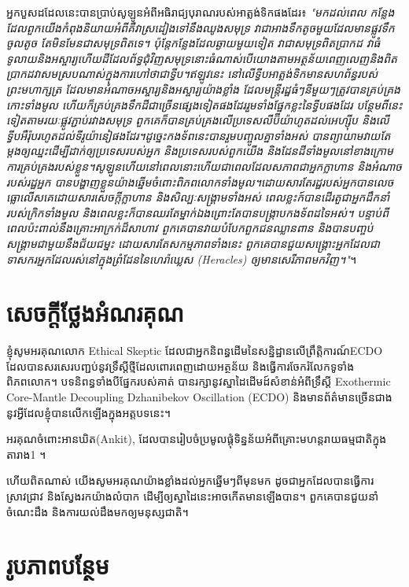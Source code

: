\documentclass[10pt,twocolumn,letterpaper]{article}
\begin{document}
អ្នកបួសដដែលនេះបានប្រាប់សូឡូនអំពីអធិរាជ្យបុរាណរបស់អាត្លង់ទិកផងដែរ៖ \textit{"មកដល់ពេល កន្លែងដែលពួកយើងកំពុងនិយាយអំពីគឺវាស្រដៀងទៅនឹងឈូងសមុទ្រ វាជាអាងទឹកតូចមួយដែលមានផ្លូវទឹកចូលតូច តែមិនមែនជាសមុទ្រពិតទេ។ ប៉ុន្តែកន្លែងដែលឆ្ងាយមួយទៀត វាជាសមុទ្រពិតប្រាកដ វាធំទូលាយនិងអស្ចារ្យហើយដីដែលព័ទ្ធជុំវិញសមុទ្រនោះធំណាស់​បើយោងតាមអត្ថន័យពេញលេញនិងពិតប្រាកដ​វាសមស្របណាស់ក្នុងការហៅថាជាទ្វីប។ឥឡូវនេះ នៅលើទ្វីបអាត្លង់ទិកមានសហព័ន្ធរបស់ព្រះមហាក្សត្រ ដែលមានអំណាចអស្ចារ្យនិងអស្ចារ្យយ៉ាងខ្លាំង ដែលមន្ត្រីរដ្ឋធំៗនីមួយៗត្រូវបានគ្រប់គ្រងកោះទាំងមូល ហើយក៏គ្រប់គ្រងទឹកដីជាច្រើនផ្សេងទៀតផងដែររួមទាំងផ្នែកខ្លះនៃទ្វីបផងដែរ បន្ថែមពីនេះទៀតតាមរយៈផ្លូវភ្ជាប់រវាងសមុទ្រ ពួកគេក៏បានគ្រប់គ្រងលើប្រទេសលីប៊ីយ៉ាហូតដល់អេហ្ស៊ីប និងលើទ្វីបអឺរ៉ុបរហូតដល់ទីរូយ៉ានៀផងដែរ។​ដូច្នេះកងទ័ពនេះបានរួមបញ្ចូលគ្នាទាំងអស់ បានព្យាយាមវាយតែម្តងឲ្យឈ្នះ​ដើម្បីដាក់ឲ្យប្រទេសរបស់អ្នក និងប្រទេសរបស់ពួកយើង និងដែនដីទាំងមូលនៅខាងក្រោមការគ្រប់គ្រងរបស់ខ្លួន។​សូឡូនហើយនៅពេលនោះហើយ​ជាពេលដែលសភាពជាអ្នកក្លាហាន និងអំណាចរបស់រដ្ឋអ្នក បានបង្ហាញខ្លួនយ៉ាងឆ្នើមចំពោះពិភពលោកទាំងមូល។​ដោយសារតែរដ្ឋរបស់អ្នកបានលេចធ្លោលើសគេដោយសារសេចក្តីក្លាហាន និងសិល្បៈសង្គ្រាមទាំងអស់ ពេលខ្លះក៍បានដើរតួជាអ្នកដឹកនាំរបស់ក្រិកទាំងមូល និងពេលខ្លះក៏បានឈរតែម្នាក់ឯង​ព្រោះតែបានបង្ក្រាបកងទ័ពដទៃអស់។ បន្ទាប់ពីពេលប៉ះពាល់នឹងគ្រោះអាក្រក់ដ៏សាហាវ ពួកគេបានវាយបំបែកពួកជនឈ្លានពាន និងបានបញ្ចប់សង្គ្រាមជាមួយនឹងជ័យជម្នះ ដោយសារតែសកម្មភាពទាំងនេះ ពួកគេបានជួយសង្គ្រោះអ្នកដែលជាទាសករ​អ្នកដែលរស់នៅក្នុងព្រំដែននៃហេរ៉ាឃ្លេស (Heracles) ឲ្យមានសេរីភាពមកវិញ។"}។

\section{សេចក្តីថ្លែងអំណរគុណ}

ខ្ញុំសូមអរគុណលោក Ethical Skeptic ដែលជាអ្នកនិពន្ធដើមនៃសន្និដ្ឋានលើព្រឹត្តិការណ៍ECDO ដែលបានសរសេរបញ្ជប់នូវទ្រឹស្តីថ្មីដែលពោរពេញដោយអត្ថន័យ និងធ្វើការចែករំលែកទូទាំងពិភពលោក។ បទនិពន្ធទាំងបីផ្នែករបស់គាត់ \cite{1} បានរក្សានូវស្នាដៃដើមដ៍សំខាន់អំពីទ្រឹស្តី Exothermic Core-Mantle Decoupling Dzhanibekov Oscillation (ECDO) និងមានព័ត៌មានច្រើនជាងនូវអ្វីដែលខ្ញុំបានលើកឡើងក្នុងអត្តបទនេះ។

អរគុណចំពោះអានឃិត(Ankit), ដែលបានរៀបចំប្រមូលផ្ដុំទិន្នន័យអំពីគ្រោះមហន្តរាយធម្មជាតិក្នុងតារាង1 ។

ហើយពិតណាស់ យើងសូមអរគុណយ៉ាងខ្លាំងដល់អ្នកឆ្នើមៗពីមុនមក ដូចជាអ្នកដែលបានធ្វើការស្រាវជ្រាវ និងស្វែងរកយ៉ាងលំបាក ដើម្បីឲ្យស្នាដៃនេះអាចកើតមានឡើងបាន។ ពួកគេបានជួយនាំចំណេះដឹង និងការយល់ដឹងមកឲ្យមនុស្សជាតិ។

\clearpage
\twocolumn

\section{រូបភាពបន្ថែម}
\end{document}
